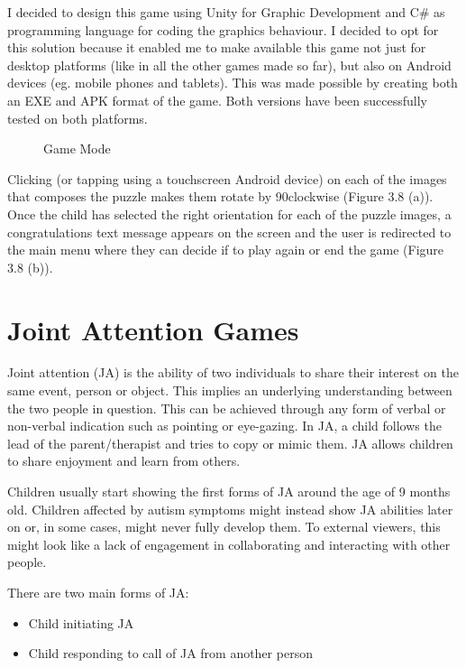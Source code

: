 I decided to design this game using Unity for Graphic Development and C\# as programming language for coding the graphics behaviour. I decided to opt for this solution because it enabled me to make available this game not just for desktop platforms (like in all the other games made so far), but also on Android devices (eg. mobile phones and tablets). This was made possible by creating both an EXE and APK format of the game. Both versions have been successfully tested on both platforms. 

\begin{figure}[ht!]%
    \centering
    \qquad
    \caption{Game Mode}%
    \label{fig:example2}%
\end{figure}

Clicking (or tapping using a touchscreen Android device) on each of the images that composes the puzzle makes them rotate by 90\degree  clockwise (Figure 3.8 (a)). Once the child has selected the right orientation for each of the puzzle images, a congratulations text message appears on the screen and the user is redirected to the main menu where they can decide if to play again or end the game (Figure 3.8 (b)).

\section{Joint Attention Games}
Joint attention (JA) is the ability of two individuals to share their interest on the same event, person or object. This implies an underlying understanding between the two people in question. This can be achieved through any form of verbal or non-verbal indication such as pointing or eye-gazing. In JA, a child follows the lead of the parent/therapist and tries to copy or mimic them. JA allows children to share enjoyment and learn from others.

Children usually start showing the first forms of JA around the age of 9 months old. Children affected by autism symptoms might instead show JA abilities later on or, in some cases, might never fully develop them. To external viewers, this might look like a lack of engagement in collaborating and interacting with other people. 

There are two main forms of JA:
\begin{itemize}
\itemsep0em
\item Child initiating JA
\item Child responding to call of JA from another person
\end{itemize}

